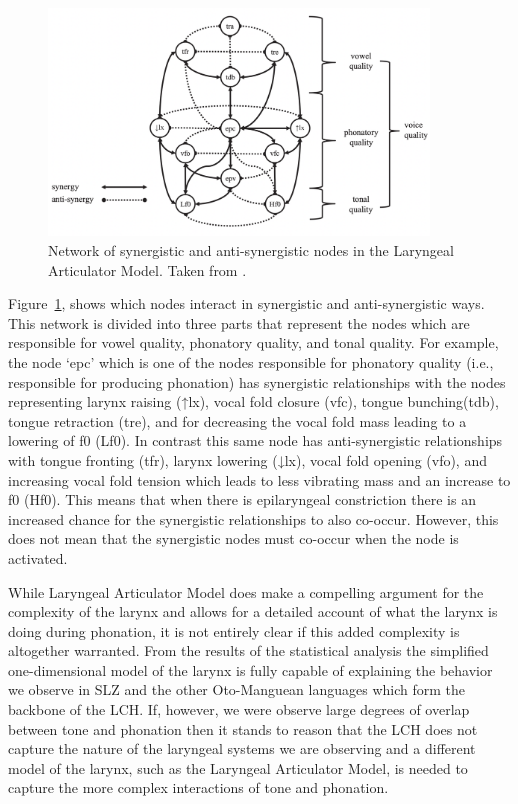 \documentclass[12pt, letterpaper]{article}
\begin{document}
\begin{figure}[!ht]
	\centering
	\includegraphics[width=0.9\textwidth]{../LAMNetwork.png}
	\caption{Network of synergistic and anti-synergistic nodes in the Laryngeal Articulator Model. Taken from \citet{eslingVoiceQualityLaryngeal2019}.}
	\label{fig:LAMNetwork}
\end{figure}
	
Figure~\ref{fig:LAMNetwork}, shows which nodes interact in synergistic and anti-synergistic ways. This network is divided into three parts that represent the nodes which are responsible for vowel quality, phonatory quality, and tonal quality. For example, the node `epc' which is one of the nodes responsible for phonatory quality (i.e., responsible for producing phonation) has synergistic relationships with the nodes representing larynx raising (↑lx), vocal fold closure (vfc), tongue bunching(tdb), tongue retraction (tre), and for decreasing the vocal fold mass leading to a lowering of f0 (Lf0). In contrast this same node has anti-synergistic relationships with tongue fronting (tfr), larynx lowering (↓lx), vocal fold opening (vfo), and increasing vocal fold tension which leads to less vibrating mass and an increase to f0 (Hf0). This means that when there is epilaryngeal constriction there is an increased chance for the synergistic relationships to also co-occur. However, this does not mean that the synergistic nodes must co-occur when the node is activated. 

While  Laryngeal Articulator Model does make a compelling argument for the complexity of the larynx and allows for a detailed account of what the larynx is doing during phonation, it is not entirely clear if this added complexity is altogether warranted. From the results of the statistical analysis the simplified one-dimensional model of the larynx is fully capable of explaining the behavior we observe in SLZ and the other Oto-Manguean languages which form the backbone of the LCH. If, however, we were observe large degrees of overlap between tone and phonation then it stands to reason that the LCH does not capture the nature of the laryngeal systems we are observing and a different model of the larynx, such as the Laryngeal Articulator Model, is needed to capture the more complex interactions of tone and phonation. 
\end{document}
